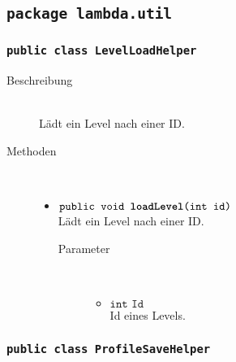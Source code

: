 \subsection{\texttt{package lambda.util}}

\subsubsection{\normalfont \texttt{public class \textbf{LevelLoadHelper}}}

\begin{description}
\item[Beschreibung] \hfill \\ Lädt ein Level nach einer ID.

\item[Methoden] \hfill \\
	\vspace{-.8cm}
	\begin{itemize}
		\item $\texttt{public void \textbf{loadLevel}(int id)}$ \\ Lädt ein Level nach einer ID.
		\begin{description}
			\item[Parameter] \hfill \\
			\vspace{-.8cm}
			\begin{itemize}
				\item $\texttt{int Id}$ \\ Id eines Levels.
			\end{itemize}
		\end{description}
		
			\end{itemize}
\end{description}
		\subsubsection{\normalfont \texttt{public class \textbf{ProfileSaveHelper}}}

